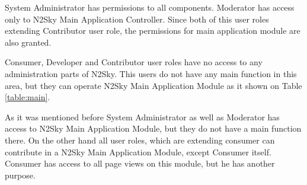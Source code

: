 System Administrator has permissions to all components. Moderator has access only to N2Sky Main Application Controller. Since both of this user roles extending Contributor user role, the permissions for main application module are also granted.

Consumer, Developer and Contributor user roles have no access to any administration parts of N2Sky. This users do not have any main function in this area, but they can operate N2Sky Main Application Module as it shown on Table \ref{table:main}.

\begin{table}[]
\caption{User Roles main functions considering "N2Sky Main Application Module". 
"+" for allowed, "-" for disallowed}
\label{table:main}
\end{table}

As it was mentioned before System Administrator as well as Moderator has access to N2Sky Main Application Module, but they do not have a main function there. On the other hand all user roles, which are extending consumer can contribute in a N2Sky Main Application Module, except Consumer itself. Consumer has access to all page views on this module, but he has another purpose. 



